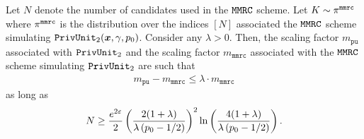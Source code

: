 \begin{lemma}\label{lemma:mmrc_privunit_approximation_error}
Let $N$ denote the number of candidates used in the \emph{$\texttt{MMRC}$} scheme. Let $K \sim \pi^{\texttt{mmrc}}$ where $\pi^{\texttt{mmrc}}$ is the distribution over the indices $[N]$ associated the \emph{$\texttt{MMRC}$} scheme simulating \emph{$\texttt{PrivUnit}_2({\boldsymbol{x}},\gamma, p_0)$}. Consider any $\lambda > 0$.
Then, the scaling factor $m_{\texttt{pu}}$ associated with \emph{$\texttt{PrivUnit}_2$} and the scaling factor $m_\texttt{mmrc}$ associated with the \emph{$\texttt{MMRC}$} scheme simulating \emph{$\texttt{PrivUnit}_2$} are such that
\begin{align}
    m_{\texttt{pu}} - m_\texttt{mmrc} \leq \lambda\cdot m_\texttt{mmrc}
\end{align}
as long as
\begin{align}
    N \geq   \frac{e^{2\varepsilon}}{2} \left(\frac{2 (1+\lambda)}{\lambda \left( p_0 -1/2 \right)}\right)^2 \ln\left( \frac{4(1+\lambda)}{\lambda \left( p_0 -1/2 \right)} \right).
\end{align}
\end{lemma}
